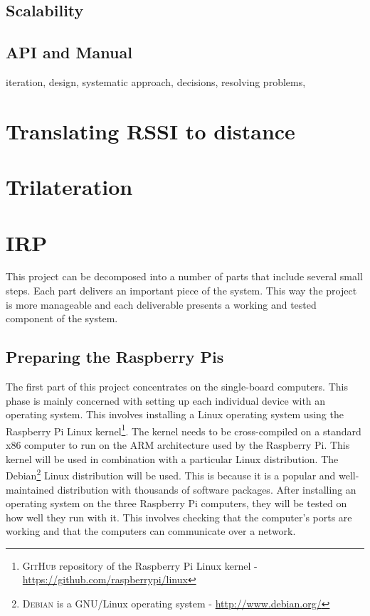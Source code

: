 \subsection{Scalability}



\subsection{API and Manual}

iteration, design, systematic approach, decisions, resolving problems, 

\section{Translating RSSI to distance}

\section{Trilateration}

\section{IRP}

This project can be decomposed into a number of parts that include several small steps. Each part delivers an important piece of the system. This way the project is more manageable and each deliverable presents a working and tested component of the system.

\subsection{Preparing the Raspberry Pis}
The first part of this project concentrates on the single-board computers. This phase is mainly concerned with setting up each individual device with an operating system. This involves installing a Linux operating system using the Raspberry Pi Linux kernel\footnote{\textsc{GitHub} repository of the Raspberry Pi Linux kernel - \url{https://github.com/raspberrypi/linux}}. The kernel needs to be cross-compiled on a standard x86 computer to run on the ARM architecture used by the Raspberry Pi. This kernel will be used in combination with a particular Linux distribution. The Debian\footnote{\textsc{Debian} is a GNU/Linux operating system - \url{http://www.debian.org/}} Linux distribution will be used. This is because it is a popular and well-maintained distribution with thousands of software packages. After installing an operating system on the three Raspberry Pi computers, they will be tested on how well they run with it. This involves checking that the computer's ports are working and that the computers can communicate over a network.

